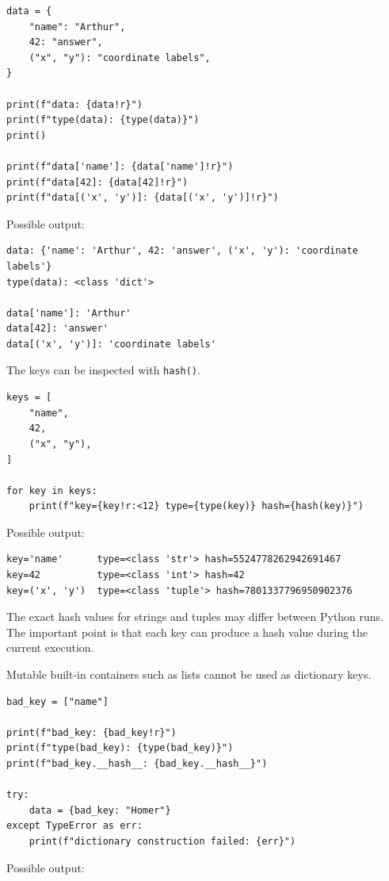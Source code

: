 \begin{verbatim}
data = {
    "name": "Arthur",
    42: "answer",
    ("x", "y"): "coordinate labels",
}

print(f"data: {data!r}")
print(f"type(data): {type(data)}")
print()

print(f"data['name']: {data['name']!r}")
print(f"data[42]: {data[42]!r}")
print(f"data[('x', 'y')]: {data[('x', 'y')]!r}")
\end{verbatim}

Possible output:

\begin{verbatim}
data: {'name': 'Arthur', 42: 'answer', ('x', 'y'): 'coordinate labels'}
type(data): <class 'dict'>

data['name']: 'Arthur'
data[42]: 'answer'
data[('x', 'y')]: 'coordinate labels'
\end{verbatim}

The keys can be inspected with \texttt{hash()}.

\begin{verbatim}
keys = [
    "name",
    42,
    ("x", "y"),
]

for key in keys:
    print(f"key={key!r:<12} type={type(key)} hash={hash(key)}")
\end{verbatim}

Possible output:

\begin{verbatim}
key='name'      type=<class 'str'> hash=5524778262942691467
key=42          type=<class 'int'> hash=42
key=('x', 'y')  type=<class 'tuple'> hash=7801337796950902376
\end{verbatim}

The exact hash values for strings and tuples may differ between Python runs. The important point is that each key can produce a hash value during the current execution.

Mutable built-in containers such as lists cannot be used as dictionary keys.

\begin{verbatim}
bad_key = ["name"]

print(f"bad_key: {bad_key!r}")
print(f"type(bad_key): {type(bad_key)}")
print(f"bad_key.__hash__: {bad_key.__hash__}")

try:
    data = {bad_key: "Homer"}
except TypeError as err:
    print(f"dictionary construction failed: {err}")
\end{verbatim}

Possible output:

